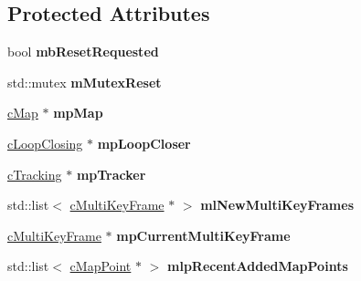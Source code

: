 \subsection*{Protected Attributes}
\begin{DoxyCompactItemize}
\item 
bool {\bfseries mb\+Reset\+Requested}\hypertarget{classMultiColSLAM_1_1cLocalMapping_ab4a3674105e5b89a8625eaf8c5460130}{}\label{classMultiColSLAM_1_1cLocalMapping_ab4a3674105e5b89a8625eaf8c5460130}

\item 
std\+::mutex {\bfseries m\+Mutex\+Reset}\hypertarget{classMultiColSLAM_1_1cLocalMapping_a403b54af8c753eaa7833563003a34e2a}{}\label{classMultiColSLAM_1_1cLocalMapping_a403b54af8c753eaa7833563003a34e2a}

\item 
\hyperlink{classMultiColSLAM_1_1cMap}{c\+Map} $\ast$ {\bfseries mp\+Map}\hypertarget{classMultiColSLAM_1_1cLocalMapping_a33bc0b5bc2519104b1db2dafeb291d9e}{}\label{classMultiColSLAM_1_1cLocalMapping_a33bc0b5bc2519104b1db2dafeb291d9e}

\item 
\hyperlink{classMultiColSLAM_1_1cLoopClosing}{c\+Loop\+Closing} $\ast$ {\bfseries mp\+Loop\+Closer}\hypertarget{classMultiColSLAM_1_1cLocalMapping_a52e7808695566c71ea65b0e71122e97d}{}\label{classMultiColSLAM_1_1cLocalMapping_a52e7808695566c71ea65b0e71122e97d}

\item 
\hyperlink{classMultiColSLAM_1_1cTracking}{c\+Tracking} $\ast$ {\bfseries mp\+Tracker}\hypertarget{classMultiColSLAM_1_1cLocalMapping_abc59b95626bda2fcca67a949a7763684}{}\label{classMultiColSLAM_1_1cLocalMapping_abc59b95626bda2fcca67a949a7763684}

\item 
std\+::list$<$ \hyperlink{classMultiColSLAM_1_1cMultiKeyFrame}{c\+Multi\+Key\+Frame} $\ast$ $>$ {\bfseries ml\+New\+Multi\+Key\+Frames}\hypertarget{classMultiColSLAM_1_1cLocalMapping_aa6bf804643aa6f59b9447ac4378374b0}{}\label{classMultiColSLAM_1_1cLocalMapping_aa6bf804643aa6f59b9447ac4378374b0}

\item 
\hyperlink{classMultiColSLAM_1_1cMultiKeyFrame}{c\+Multi\+Key\+Frame} $\ast$ {\bfseries mp\+Current\+Multi\+Key\+Frame}\hypertarget{classMultiColSLAM_1_1cLocalMapping_a514ace7ba39e32dc54eb7bdf227d965c}{}\label{classMultiColSLAM_1_1cLocalMapping_a514ace7ba39e32dc54eb7bdf227d965c}

\item 
std\+::list$<$ \hyperlink{classMultiColSLAM_1_1cMapPoint}{c\+Map\+Point} $\ast$ $>$ {\bfseries mlp\+Recent\+Added\+Map\+Points}\hypertarget{classMultiColSLAM_1_1cLocalMapping_afe63ec5719ff8e60736d5ed46e139602}{}\label{classMultiColSLAM_1_1cLocalMapping_afe63ec5719ff8e60736d5ed46e139602}


\end{DoxyCompactItemize}
